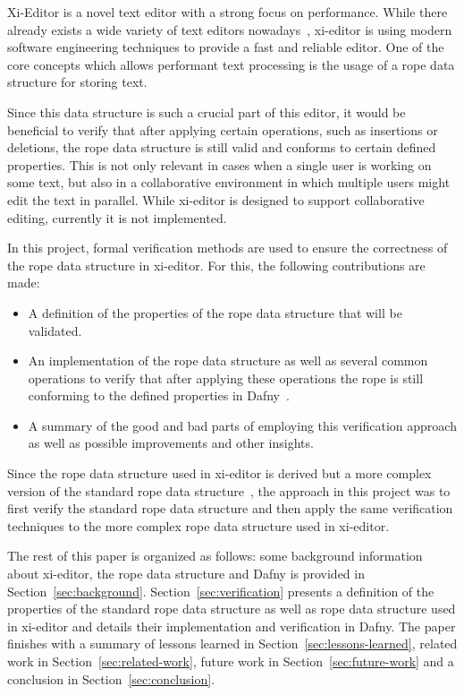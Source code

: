 Xi-Editor is a novel text editor with a strong focus on performance.
While there already exists a wide variety of text editors nowadays~\cite{vi, pike1987text, atom, sublime}, xi-editor is using modern software engineering techniques to provide a fast and reliable editor.
One of the core concepts which allows performant text processing is the usage of a rope data structure for storing text.

Since this data structure is such a crucial part of this editor, it would be beneficial to verify that after applying certain operations, such as insertions or deletions, the rope data structure is still valid and conforms to certain defined properties.
This is not only relevant in cases when a single user is working on some text, but also in a collaborative environment in which multiple users might edit the text in parallel.
While xi-editor is designed to support collaborative editing, currently it is not implemented.

In this project, formal verification methods are used to ensure the correctness of the rope data structure in xi-editor.
For this, the following contributions are made:

\begin{itemize}
	\item A definition of the properties of the rope data structure that will be validated.
	\item An implementation of the rope data structure as well as several common operations to verify that after applying these operations the rope is still conforming to the defined properties in Dafny~\cite{leino2010dafny}.
	\item A summary of the good and bad parts of employing this verification approach as well as possible improvements and other insights.
\end{itemize}

Since the rope data structure used in xi-editor is derived but a more complex version of the standard rope data structure~\cite{boehm1995ropes}, the approach in this project was to first verify the standard rope data structure and then apply the same verification techniques to the more complex rope data structure used in xi-editor.

The rest of this paper is organized as follows: some background information about xi-editor, the rope data structure and Dafny is provided in Section~\ref{sec:background}.
Section~\ref{sec:verification} presents a definition of the properties of the standard rope data structure as well as rope data structure used in xi-editor and details their implementation and verification in Dafny.
The paper finishes with a summary of lessons learned in Section~\ref{sec:lessons-learned}, related work in Section~\ref{sec:related-work}, future work in Section~\ref{sec:future-work} and a conclusion in Section~\ref{sec:conclusion}.
